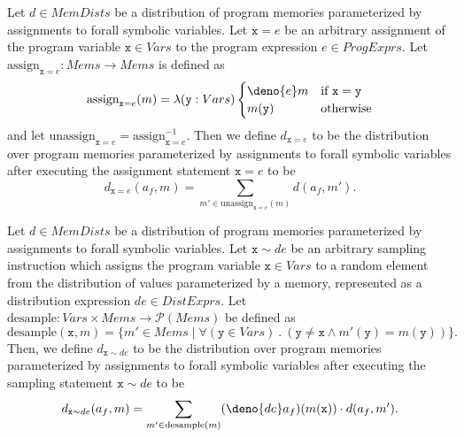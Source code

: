 \documentclass[acmsmall,review]{acmart}\settopmatter{}
\begin{document}
	\begin{definition}
		Let $d \in MemDists$ be a distribution of program memories parameterized by assignments to forall symbolic variables. Let $\mathtt{x} = e$ be an arbitrary assignment of the program variable $\mathtt{x} \in Vars$ to the program expression $e \in ProgExprs$. Let $\text{assign}_{\mathtt{x}=e} : Mems \rightarrow Mems$ is defined as
		\[
		\text{assign}_{\mathtt{x}=e}(m) = \lambda(\mathtt{y} : Vars)
		\begin{cases}
			\deno{e}m & \text{if $\mathtt{x} = \mathtt{y}$}\\
			m(\mathtt{y}) & \text{otherwise}
		\end{cases}
		\]
		and let $\text{unassign}_{\mathtt{x}=e} = \text{assign}_{\mathtt{x}=e}^{-1}$. Then we define $d_{\mathtt{x}=e}$ to be the distribution over program memories parameterized by assignments to forall symbolic variables after executing the assignment statement $\mathtt{x}=e$ to be
		\[
		d_{\mathtt{x}=e}(a_f,m) = \sum_{m' \in \text{unassign}_{\mathtt{x}=e}(m)} d(a_f,m').
		\]
	\end{definition}
	
	\begin{definition}
		Let $d \in MemDists$ be a distribution of program memories parameterized by assignments to forall symbolic variables. Let $\mathtt{x} \sim de$ be an arbitrary sampling instruction which assigns the program variable $\mathtt{x} \in Vars$ to a random element from the distribution of values parameterized by a memory, represented as a distribution expression $de \in DistExprs$. Let $\text{desample} : Vars \times Mems \rightarrow \mathcal{P}(Mems)$ be defined as
		\[
		\text{desample}(\mathtt{x},m) = \{ m'\in Mems \mid \forall (\mathtt{y} \in Vars)~.~(\mathtt{y} \neq \mathtt{x} \wedge m'(\mathtt{y}) = m(\mathtt{y}))\}.
		\]
		Then, we define $d_{\mathtt{x} \sim de}$ to be the distribution over program memories parameterized by assignments to forall symbolic variables after executing the sampling statement $\mathtt{x} \sim de$ to be
		\[
		d_{\mathtt{x} \sim de}(a_f,m) = \sum_{m' \in \text{desample}(m)} (\deno{de}a_f)(m(\mathtt{x})) \cdot d(a_f,m').
		\]
	\end{definition}
	
\end{document}

